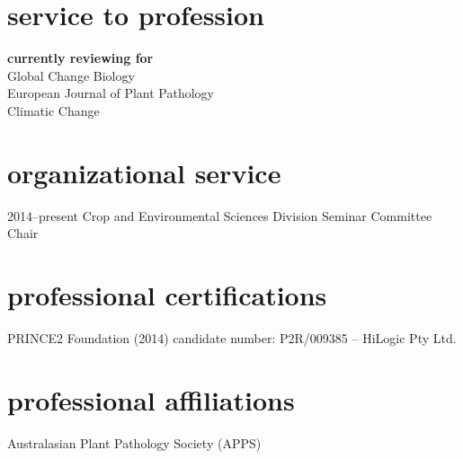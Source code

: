         \section*{service to profession}
        \textbf{currently reviewing for}\\
        Global Change Biology\\
        European Journal of Plant Pathology\\
        Climatic Change\\
        
      \section*{organizational service}
        \begin{entrylist}
          \entry
        	{2014--present}
        	{Crop and Environmental Sciences Division Seminar Committee Chair}
        	{}
        	{}
        \end{entrylist}
        \section*{professional certifications}
        PRINCE2 Foundation (2014) candidate number: P2R/009385 – HiLogic  Pty Ltd.
        
        \section*{professional affiliations}
        Australasian Plant Pathology Society (APPS) 
